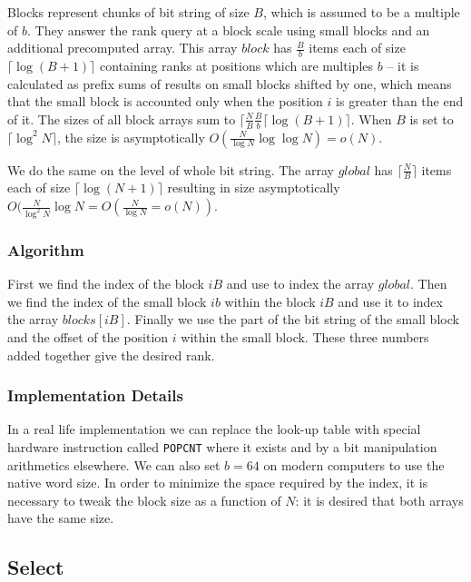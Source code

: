 Blocks represent chunks of bit string of size $B$, which is assumed to be a multiple of $b$.
They answer the rank query at a block scale using small blocks and an additional precomputed array.
This array $block$ has $\frac{B}{b}$ items each of size $\lceil \log (B + 1) \rceil$ containing ranks at positions which are multiples $b$ -- it is calculated as prefix sums of results on small blocks shifted by one, which means that the small block is accounted only when the position $i$ is greater than the end of it.
The sizes of all block arrays sum to $\lceil \frac{N}{B} \frac{B}{b} \lceil \log (B + 1) \rceil$.
When $B$ is set to $\lceil \log^2 N \rceil$, the size is asymptotically $O(\frac{N}{\log N} \log \log N) = o(N)$.

We do the same on the level of whole bit string.
The array $global$ has $\lceil \frac{N}{B} \rceil$ items each of size $\lceil \log (N+1) \rceil$ resulting in size asymptotically $O(\frac{N}{\log^2 N} \log{N} = O(\frac{N}{\log N} = o(N))$.

\subsubsection{Algorithm}

First we find the index of the block $iB$ and use to index the array $global$.
Then we find the index of the small block $ib$ within the block $iB$ and use it to index the array $blocks[iB]$.
Finally we use the part of the bit string of the small block and the offset of the position $i$ within the small block.
These three numbers added together give the desired rank.

\subsubsection{Implementation Details}

In a real life implementation we can replace the look-up table with special hardware instruction called \verb|POPCNT| where it exists and by a bit manipulation arithmetics elsewhere.
We can also set $b = 64$ on modern computers to use the native word size.
In order to minimize the space required by the index, it is necessary to tweak the block size as a function of $N$: it is desired that both arrays have the same size.

\subsection{Select}

